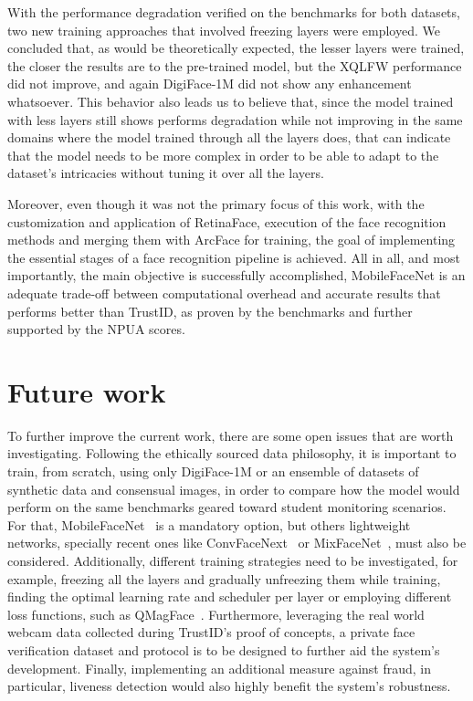 \documentclass[class=report, crop=false, a4paper, 12pt]{standalone}
\begin{document}
\par With the performance degradation verified on the benchmarks for both datasets, two new training approaches that involved freezing layers were employed. We concluded that, as would be theoretically expected, the lesser layers were trained, the closer the results are to the pre-trained model, but the XQLFW performance did not improve, and again DigiFace-1M did not show any enhancement whatsoever. This behavior also leads us to believe that, since the model trained with less layers still shows performs degradation while not improving in the same domains where the model trained through all the layers does, that can indicate that the model needs to be more complex in order to be able to adapt to the dataset's intricacies without tuning it over all the layers.

\par Moreover, even though it was not the primary focus of this work, with the customization and application of RetinaFace, execution of the face recognition methods and merging them with ArcFace for training, the goal of implementing the essential stages of a face recognition pipeline is achieved. All in all, and most importantly, the main objective is successfully accomplished, MobileFaceNet is an adequate trade-off between computational overhead and accurate results that performs better than TrustID, as proven by the benchmarks and further supported by the NPUA scores.

\section{Future work}
To further improve the current work, there are some open issues that are worth investigating. Following the ethically sourced data philosophy, it is important to train, from scratch, using only DigiFace-1M or an ensemble of datasets of synthetic data and consensual images, in order to compare how the model would perform on the same benchmarks geared toward student monitoring scenarios. For that, MobileFaceNet~\autocite{chenMobileFaceNetsEfficientCNNs2018} is a mandatory option, but others lightweight networks, specially recent ones like ConvFaceNext~\autocite{hooConvFaceNeXtLightweightNetworks2022} or MixFaceNet~\autocite{boutrosMixFaceNetsExtremelyEfficient2021}, must also be considered. Additionally, different training strategies need to be investigated, for example, freezing all the layers and gradually unfreezing them while training, finding the optimal learning rate and scheduler per layer or employing different loss functions, such as QMagFace~\autocite{terhorstQMagFaceSimpleAccurate2023}. Furthermore, leveraging the real world webcam data collected during TrustID's proof of concepts, a private face verification dataset and protocol is to be designed to further aid the system's development. Finally, implementing an additional measure against fraud, in particular, liveness detection would also highly benefit the system's robustness. 
\end{document}
